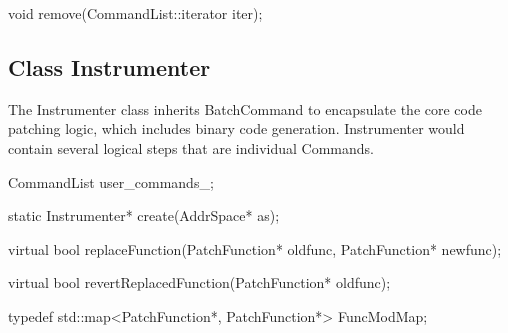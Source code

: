 \begin{apient}
void remove(CommandList::iterator iter);
\end{apient}


\subsection{Class Instrumenter}
\label{sec:instrumenter}


The Instrumenter class inherits BatchCommand to encapsulate the core code
patching logic, which includes binary code generation. Instrumenter would
contain several logical steps that are individual Commands.


\begin{apient}
CommandList user_commands_;
\end{apient}



\begin{apient}
static Instrumenter* create(AddrSpace* as);
\end{apient}


\begin{apient}
virtual bool replaceFunction(PatchFunction* oldfunc, PatchFunction* newfunc);
\end{apient}



\begin{apient}
virtual bool revertReplacedFunction(PatchFunction* oldfunc);
\end{apient}


\begin{apient}
typedef std::map<PatchFunction*, PatchFunction*> FuncModMap;
\end{apient}

